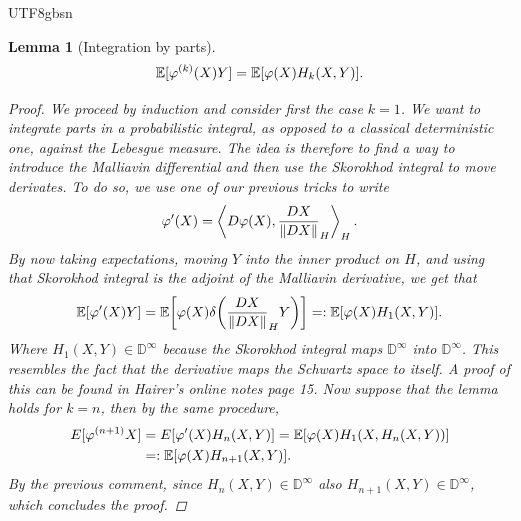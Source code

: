 \documentclass[12pt]{article}
\newtheorem{lemma}{Lemma}
\newcommand{\br}[1]{\left\langle#1\right\rangle}
\begin{document}
\begin{CJK*}{UTF8}{gbsn}
\begin{lemma}[Integration by parts]
		\begin{equation*}
			\mathbb{E}[\varphi^{(k)}(X)Y]=\mathbb{E}[\varphi(X)H_k(X,Y)].
		\end{equation*}
		\begin{proof}We proceed by induction and consider first the case $k=1$. We want to integrate parts in a probabilistic integral, as opposed to a classical deterministic one, against the Lebesgue measure. The idea is therefore to find a way to introduce the Malliavin differential and then use the Skorokhod integral to move derivates. To do so, we use one of our previous tricks to write
			\begin{equation*}
				\varphi'(X)=\br{D\varphi(X),\frac{DX}{\norm{DX}}_{H}}_{H}.
			\end{equation*}
			By now taking expectations, moving $Y$ into the inner product on  $H$, and using that Skorokhod integral is the adjoint of the Malliavin derivative, we get that
			\begin{equation*}
				\mathbb{E}[\varphi'(X)Y]=\mathbb{E}\qty[\varphi(X)\delta \qty(\frac{DX}{\norm{DX}}_{H}Y)]=:\mathbb{E}[\varphi(X)H_1(X,Y)].
			\end{equation*}
			Where  $H_1(X,Y)\in \mathbb{D}^\infty$ because the Skorokhod integral maps $\mathbb{D}^\infty$ into $\mathbb{D}^\infty$. This resembles the fact that the derivative maps the Schwartz space to itself. A proof of this can be found in Hairer's online notes \cite{hairer2021introduction} page 15. Now suppose that the lemma  holds for $k=n$, then by the same procedure,
			\begin{align*}
				E[\varphi^{(n+1)}X] & =E[\varphi'(X) H_n(X,Y)]=\mathbb{E}[\varphi(X)H_1(X,H_n(X,Y))] \\&=:\mathbb{E}[\varphi(X)H_{n+1}(X,Y)].
			\end{align*}
			By the previous comment, since $H_n(X,Y)\in \mathbb{D}^\infty$ also $H_{n+1}(X,Y)\in \mathbb{D}^\infty$, which concludes the proof.
		\end{proof}


\end{lemma}
\end{CJK*}
\end{document}
